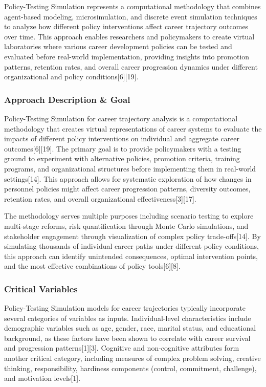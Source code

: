 \documentclass[main.tex]{subfiles}
\begin{document}
Policy-Testing Simulation represents a computational methodology that combines agent-based modeling, microsimulation, and discrete event simulation techniques to analyze how different policy interventions affect career trajectory outcomes over time. This approach enables researchers and policymakers to create virtual laboratories where various career development policies can be tested and evaluated before real-world implementation, providing insights into promotion patterns, retention rates, and overall career progression dynamics under different organizational and policy conditions[6][19].

\subsubsection{Approach Description \& Goal}

Policy-Testing Simulation for career trajectory analysis is a computational methodology that creates virtual representations of career systems to evaluate the impacts of different policy interventions on individual and aggregate career outcomes[6][19]. The primary goal is to provide policymakers with a testing ground to experiment with alternative policies, promotion criteria, training programs, and organizational structures before implementing them in real-world settings[14]. This approach allows for systematic exploration of how changes in personnel policies might affect career progression patterns, diversity outcomes, retention rates, and overall organizational effectiveness[3][17].

The methodology serves multiple purposes including scenario testing to explore multi-stage reforms, risk quantification through Monte Carlo simulations, and stakeholder engagement through visualization of complex policy trade-offs[14]. By simulating thousands of individual career paths under different policy conditions, this approach can identify unintended consequences, optimal intervention points, and the most effective combinations of policy tools[6][8].

\subsubsection{Critical Variables}

Policy-Testing Simulation models for career trajectories typically incorporate several categories of variables as inputs. Individual-level characteristics include demographic variables such as age, gender, race, marital status, and educational background, as these factors have been shown to correlate with career survival and progression patterns[1][3]. Cognitive and non-cognitive attributes form another critical category, including measures of complex problem solving, creative thinking, responsibility, hardiness components (control, commitment, challenge), and motivation levels[1].
\end{document}
